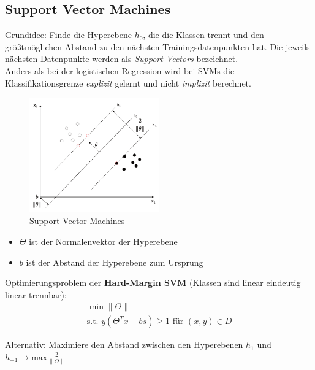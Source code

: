 \subsection{Support Vector Machines}
\label{svm}
\underline{Grundidee}: Finde die Hyperebene $h_0$, die die Klassen trennt und den größtmöglichen Abstand zu den nächsten Trainingsdatenpunkten hat. Die jeweils nächsten Datenpunkte werden als \emph{Support Vectors} bezeichnet.\\

Anders als bei der logistischen Regression wird bei SVMs die Klassifikationsgrenze \emph{explizit} gelernt und nicht \emph{implizit} berechnet.\\
\begin{figure}[!h]    
    \centering
    \includegraphics[width=0.5\textwidth]{supervisedLearning/svm.png}
    \caption{Support Vector Machines}
    \label{fig:svm}
\end{figure}

\begin{itemize}
    \item $\Theta$ ist der Normalenvektor der Hyperebene
    \item $b$ ist der Abstand der Hyperebene zum Ursprung\\
\end{itemize}

Optimierungsproblem der \textbf{Hard-Margin SVM} (Klassen sind linear eindeutig linear trennbar):
\begin{equation*}
    \begin{split}
        \min \| \Theta \|\\
        \text{s.t. } y(\Theta^Tx-bs)\geq 1 \text{ für } (x,y) \in D
    \end{split}
\end{equation*}

Alternativ: Maximiere den Abstand zwischen den Hyperebenen $h_1$ und $h_{-1}\rightarrow \text{max}\frac{2}{\|\Theta\|}$\\

